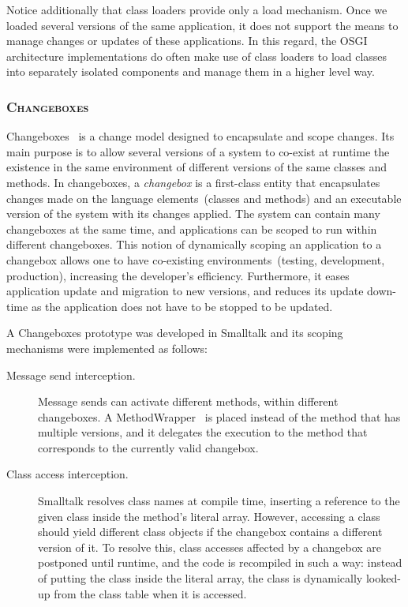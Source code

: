 Notice additionally that class loaders provide only a load mechanism. Once we loaded several versions of the same application, it does not support the means to manage changes or updates of these applications. In this regard, the OSGI~\cite{OSGI} architecture implementations do often make use of class loaders to load classes into separately isolated components and manage them in a higher level way.

\subsubsection*{\textsc{Changeboxes}}

Changeboxes~\cite{Denk07c} is a change model designed to encapsulate and scope changes. Its main purpose is to allow several versions of a system to co-exist at runtime \ie the existence in the same environment of different versions of the same classes and methods. In changeboxes, a \emph{changebox} is a first-class entity that encapsulates changes made on the language elements~(\eg classes and methods) and an executable version of the system with its changes applied. The system can contain many changeboxes at the same time, and applications can be scoped to run within different changeboxes. This notion of dynamically scoping an application to a changebox allows one to have co-existing environments~(\eg testing, development, production), increasing the developer's efficiency. Furthermore, it eases application update and migration to new versions, and reduces its update down-time as the application does not have to be stopped to be updated.

A Changeboxes prototype was developed in Smalltalk and its scoping mechanisms were implemented as follows:

\begin{description}
\item[Message send interception.] Message sends can activate different methods, within different changeboxes. A MethodWrapper~\cite{Bran98a} is placed instead of the method that has multiple versions, and it delegates the execution to the method that corresponds to the currently valid changebox.

\item[Class access interception.] Smalltalk resolves class names at compile time, inserting a reference to the given class inside the method's literal array. However, accessing a class should yield different class objects if the changebox contains a different version of it. To resolve this, class accesses affected by a changebox are postponed until runtime, and the code is recompiled in such a way: instead of putting the class inside the literal array, the class is dynamically looked-up from the class table when it is accessed.
\end{description}

